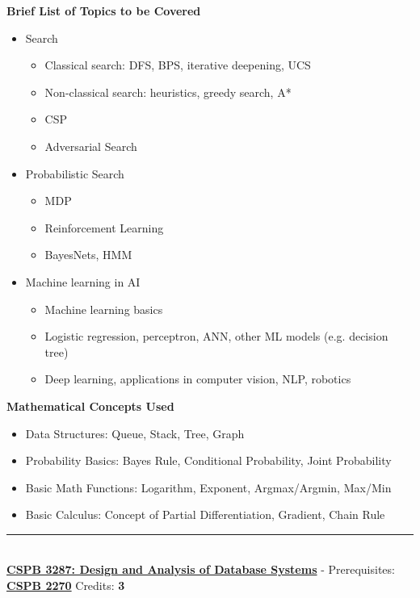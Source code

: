 \documentclass{article}
\newcommand{\horizontalline}{\noindent \rule{\textwidth}{0.5pt} \\}
\begin{document}
\noindent \textbf{Brief List of Topics to be Covered}
\begin{itemize}
    \item Search
    \begin{itemize}
        \item Classical search: DFS, BPS, iterative deepening, UCS
        \item Non-classical search: heuristics, greedy search, A*
        \item CSP
        \item Adversarial Search
    \end{itemize}
    \item Probabilistic Search
    \begin{itemize}
        \item MDP
        \item Reinforcement Learning
        \item BayesNets, HMM
    \end{itemize}
    \item Machine learning in AI
    \begin{itemize}
        \item Machine learning basics
        \item Logistic regression, perceptron, ANN, other ML models (e.g. decision tree)
        \item Deep learning, applications in computer vision, NLP, robotics
    \end{itemize}
\end{itemize}

\noindent \textbf{Mathematical Concepts Used}
\begin{itemize}
    \item Data Structures: Queue, Stack, Tree, Graph
    \item Probability Basics: Bayes Rule, Conditional Probability, Joint Probability
    \item Basic Math Functions: Logarithm, Exponent, Argmax/Argmin, Max/Min
    \item Basic Calculus: Concept of Partial Differentiation, Gradient, Chain Rule
\end{itemize}
\horizontalline
\noindent \href{https://www.colorado.edu/program/cspb/cspb-3287-design-and-analysis-database-systems}{\textbf{CSPB 3287: Design and Analysis of Database Systems}} - Prerequisites: \href{https://www.colorado.edu/program/cspb/cspb-2270-computer-science-2-data-structures}{\textbf{CSPB 2270}} Credits: \textbf{3} \\
\end{document}
